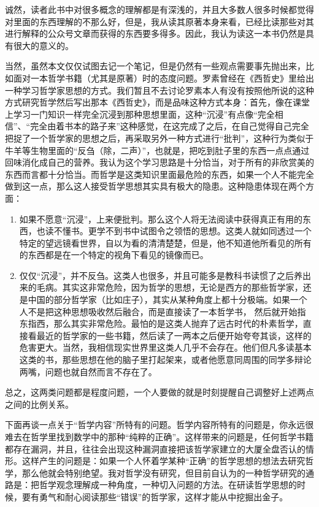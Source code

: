 \documentclass[11pt]{article}
\begin{document}
诚然，读者此书中对很多概念的理解都是有深浅的，并且大多数人很多时候都觉得对里面的东西理解的不那么好，但是，我从读其原著本身来看，已经比读那些对其进行解释的公众号文章而获得的东西要多得多。因此，我认为读这一本书仍然是具有很大的意义的。

当然，虽然本文仅仅试图去记一个笔记，但是仍然有一些观点需要事先抛出来，比如面对一本哲学书籍（尤其是原著）时的态度问题。罗素曾经在《西哲史》里给出一种学习哲学家思想的方式。我们暂且不去讨论罗素本人有没有按照他所说的这种方式研究哲学然后写出那本《西哲史》，而是品味这种方式本身：首先，像在课堂上学习一门知识一样完全沉浸到那种思想里面，这种“沉浸”有点像“完全相信”、“完全由着书本的路子来”这种感觉，在这完成了之后，在自己觉得自己完全把捉了一个哲学家的思想之后，再采取另外一种方式进行“批判”，这种行为类似于牛羊等生物里面的“反刍（除，二声）”，也就是，把吃到肚子里的东西一点点通过回味消化成自己的营养。我认为这个学习思路是十分恰当，对于所有的非欣赏美的东西而言都十分恰当。而哲学是这类知识里面最危险的东西，如果一个人不能完全做到这一点，那么这人接受哲学思想其实具有极大的隐患。这种隐患体现在两个方面：

\begin{enumerate}
\item 如果不愿意“沉浸”，上来便批判。那么这个人将无法阅读中获得真正有用的东西，也读不懂书。更学不到书中试图令之领悟的思想。这类人就如同透过一个特定的望远镜看世界，自以为看的清清楚楚，但是，他不知道他所看见的所有的东西都是在一个特定的视角下看见的镜像而已。
\item 仅仅“沉浸”，并不反刍。这类人也很多，并且可能多是教科书读惯了之后养出来的毛病。其实这非常危险，因为哲学的思想，无论是西方的那些哲学家，还是中国的部分哲学家（比如庄子），其实从某种角度上都十分极端。如果一个人不是把这种思想吸收然后融合，而是直接读了一本哲学书， 然后就开始指东指西，那么其实非常危险。最怕的是这类人抛弃了远古时代的朴素哲学，直接看最近的哲学家的一些书籍，然后读了一两本之后便开始夸夸其谈，这样的危害更大。当然，我相信现实世界里这类人几乎不会存在。他们但凡多读基本这类的书，那些思想在他的脑子里打起架来，或者他愿意同周围的同学多辩论两嘴，问题也就自然而言不存在了。
\end{enumerate}

总之，这两类问题都是程度问题，一个人要做的就是时刻提醒自己调整好上述两点之间的比例关系。

下面再谈一点关于“哲学内容”所特有的问题。哲学内容所特有的问题是，你永远很难去在哲学里找到数学中的那种“纯粹的正确”。这样带来的问题是，任何哲学书籍都存在漏洞，并且，往往会出现这种漏洞直接把该哲学家建立的大厦全盘否认的情形。这样产生的问题是：如果一个人怀着学某种“正确”的哲学思想的想法去研究哲学，那么他就会特别绝望。我对哲学没有研究，但目前自认为的一种哲学研究的通路是：把哲学观念理解成一种角度，一种切入问题的方法。在研读哲学思想的时候，要有勇气和耐心阅读那些“错误”的哲学家，这样才能从中挖掘出金子。
\end{document}
